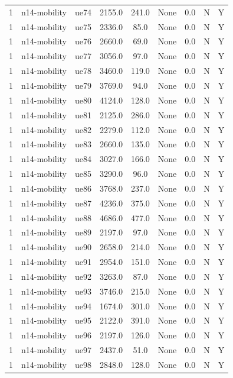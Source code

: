 \begin{table}[ht]
\begin{tabular}{|c|c|c|c|c|c|c|c|c|}
1 & n14-mobility & ue74 & 2155.0 & 241.0 & None & 0.0 & N & Y \\
1 & n14-mobility & ue75 & 2336.0 & 85.0 & None & 0.0 & N & Y \\
1 & n14-mobility & ue76 & 2660.0 & 69.0 & None & 0.0 & N & Y \\
1 & n14-mobility & ue77 & 3056.0 & 97.0 & None & 0.0 & N & Y \\
1 & n14-mobility & ue78 & 3460.0 & 119.0 & None & 0.0 & N & Y \\
1 & n14-mobility & ue79 & 3769.0 & 94.0 & None & 0.0 & N & Y \\
1 & n14-mobility & ue80 & 4124.0 & 128.0 & None & 0.0 & N & Y \\
1 & n14-mobility & ue81 & 2125.0 & 286.0 & None & 0.0 & N & Y \\
1 & n14-mobility & ue82 & 2279.0 & 112.0 & None & 0.0 & N & Y \\
1 & n14-mobility & ue83 & 2660.0 & 135.0 & None & 0.0 & N & Y \\
1 & n14-mobility & ue84 & 3027.0 & 166.0 & None & 0.0 & N & Y \\
1 & n14-mobility & ue85 & 3290.0 & 96.0 & None & 0.0 & N & Y \\
1 & n14-mobility & ue86 & 3768.0 & 237.0 & None & 0.0 & N & Y \\
1 & n14-mobility & ue87 & 4236.0 & 375.0 & None & 0.0 & N & Y \\
1 & n14-mobility & ue88 & 4686.0 & 477.0 & None & 0.0 & N & Y \\
1 & n14-mobility & ue89 & 2197.0 & 97.0 & None & 0.0 & N & Y \\
1 & n14-mobility & ue90 & 2658.0 & 214.0 & None & 0.0 & N & Y \\
1 & n14-mobility & ue91 & 2954.0 & 151.0 & None & 0.0 & N & Y \\
1 & n14-mobility & ue92 & 3263.0 & 87.0 & None & 0.0 & N & Y \\
1 & n14-mobility & ue93 & 3746.0 & 215.0 & None & 0.0 & N & Y \\
1 & n14-mobility & ue94 & 1674.0 & 301.0 & None & 0.0 & N & Y \\
1 & n14-mobility & ue95 & 2122.0 & 391.0 & None & 0.0 & N & Y \\
1 & n14-mobility & ue96 & 2197.0 & 126.0 & None & 0.0 & N & Y \\
1 & n14-mobility & ue97 & 2437.0 & 51.0 & None & 0.0 & N & Y \\
1 & n14-mobility & ue98 & 2848.0 & 128.0 & None & 0.0 & N & Y \\

\end{tabular}
\end{table}
